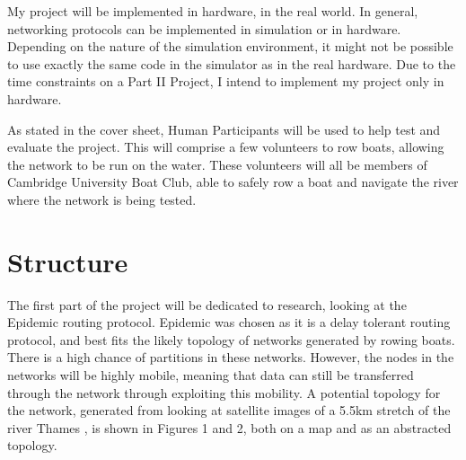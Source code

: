\documentclass[10pt, a4paper]{article}
\begin{document}
My project will be implemented in hardware, in the real world. In general, networking protocols can be implemented in simulation or in hardware. Depending on the nature of the simulation environment, it might not be possible to use exactly the same code in the simulator as in the real hardware. Due to the time constraints on a Part II Project, I intend to implement my project only in hardware. \par

As stated in the cover sheet, Human Participants will be used to help test and evaluate the project. This will comprise a few volunteers to row boats, allowing the network to be run on the water. These volunteers will all be members of Cambridge University Boat Club, able to safely row a boat and navigate the river where the network is being tested.


\section{Structure}
The first part of the project will be dedicated to research, looking at the Epidemic routing protocol. Epidemic was chosen as it is a delay tolerant routing protocol, and best fits the likely topology of networks generated by rowing boats. There is a high chance of partitions in these networks. However, the nodes in the networks will be highly mobile, meaning that data can still be transferred through the network through exploiting this mobility. A potential topology for the network, generated from looking at satellite images of a 5.5km stretch of the river Thames \cite{googlemaps}, is shown in Figures 1 and 2, both on a map and as an abstracted topology. \par
\end{document}
